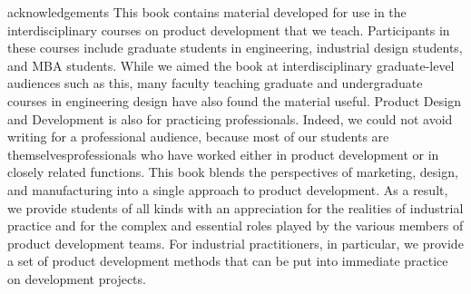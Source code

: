 \begin{acknowledgements}
acknowledgements  This book contains material developed for use in the interdisciplinary courses on product development that we teach. Participants in these courses include graduate students in engineering, industrial design students, and MBA students. While we aimed the book at interdisciplinary graduate-level audiences such as this, many faculty teaching graduate and undergraduate courses in engineering design have also found the material useful. Product Design and Development is also for practicing professionals. Indeed, we could not avoid writing  for  a  professional  audience,  because  most  of  our  students  are  themselvesprofessionals who have worked either in product development or in closely related functions.
  This book blends the perspectives of marketing, design, and manufacturing into a single approach to product development. As a result, we provide students of all kinds with an appreciation for the realities of industrial practice and for the complex and essential roles played by the various members of product development teams. For industrial practitioners, in  particular,  we  provide  a  set  of  product  development  methods  that  can  be  put  into immediate practice on development projects.
\end{acknowledgements}
